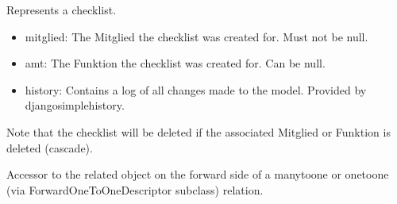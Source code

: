 \documentclass[letterpaper,10pt,english]{sphinxmanual}
\begin{document}
\begin{fulllineitems}
\label{\detokenize{masterCodeDoc:checklisten.models.Checkliste}}
Represents a checklist.
\begin{itemize}
\item {} 
mitglied: The Mitglied the checklist was created for. Must not be null.

\item {} 
amt: The Funktion the checklist was created for. Can be null.

\item {} 
history: Contains a log of all changes made to the model. Provided by django\sphinxhyphen{}simple\sphinxhyphen{}history.

\end{itemize}

Note that the checklist will be deleted if the associated Mitglied or Funktion is deleted (cascade).

\begin{fulllineitems}
\label{\detokenize{masterCodeDoc:checklisten.models.Checkliste.DoesNotExist}}
\end{fulllineitems}


\begin{fulllineitems}
\label{\detokenize{masterCodeDoc:checklisten.models.Checkliste.MultipleObjectsReturned}}
\end{fulllineitems}


\begin{fulllineitems}
\label{\detokenize{masterCodeDoc:checklisten.models.Checkliste.amt}}
Accessor to the related object on the forward side of a many\sphinxhyphen{}to\sphinxhyphen{}one or
one\sphinxhyphen{}to\sphinxhyphen{}one (via ForwardOneToOneDescriptor subclass) relation.


\end{fulllineitems}
\end{fulllineitems}
\end{document}
